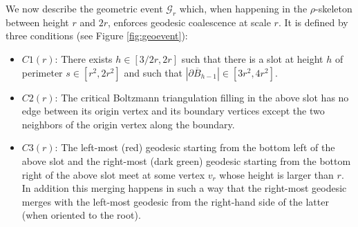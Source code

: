 \documentclass[10pt]{amsart}
\theoremstyle{definition}\newtheorem{defi}[theo]{Definition}\newtheorem{rema}[theo]{Remark}\newtheorem{exam}[theo]{Example}\newtheorem{exem}[theo]{Example}\newtheorem{nota}[theo]{Notation}
\begin{document}
We now describe the geometric event $ \mathcal{G}_{r}$ which, when happening in the $\rho$-skeleton between height $r$ and $2r$, enforces geodesic coalescence at scale $r$. It is defined by three conditions (see Figure \ref{fig:geoevent}):
 \begin{itemize}
\item  $C1(r)$: There exists $h \in [3/2 r, 2r]$ such that there is a slot at height $h$ of perimeter $ s \in [r^{2}, 2r^{2}]$ %
and such that $| \partial \overline{B}_{h-1}| \in [3r^{2}, 4r^{2}]$.
\item $C2(r)$: The critical Boltzmann triangulation filling in the above slot has no edge between its origin vertex and its boundary vertices except the two neighbors of the origin vertex along the boundary.
\item $C3(r)$: The left-most (red) geodesic starting from the bottom left of the above slot and the right-most (dark green) geodesic starting from the bottom right of the above slot meet at some vertex $v_{r}$ whose height is larger than $r$. {In addition this merging happens in such a way that the right-most geodesic merges with the left-most geodesic from the right-hand side of the latter (when oriented to the root).}
\end{itemize}
\end{document}
